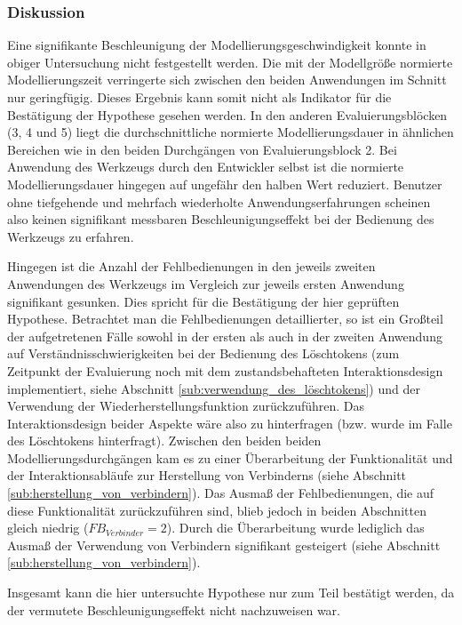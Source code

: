 \subsubsection{Diskussion} 

Eine signifikante Beschleunigung der Modellierungsgeschwindigkeit konnte in obiger Untersuchung nicht festgestellt werden. Die mit der Modellgröße normierte Modellierungszeit verringerte sich zwischen den beiden Anwendungen im Schnitt nur geringfügig. Dieses Ergebnis kann somit nicht als Indikator für die Bestätigung der Hypothese gesehen werden. In den anderen Evaluierungsblöcken (3, 4 und 5) liegt die durchschnittliche normierte Modellierungsdauer in ähnlichen Bereichen wie in den beiden Durchgängen von Evaluierungsblock 2. Bei Anwendung des Werkzeugs durch den Entwickler selbst ist die normierte Modellierungsdauer hingegen auf ungefähr den halben Wert reduziert. Benutzer ohne tiefgehende und mehrfach wiederholte Anwendungserfahrungen scheinen also keinen signifikant messbaren Beschleunigungseffekt bei der Bedienung des Werkzeugs zu erfahren.

Hingegen ist die Anzahl der Fehlbedienungen in den jeweils zweiten Anwendungen des Werkzeugs im Vergleich zur jeweils ersten Anwendung signifikant gesunken. Dies spricht für die Bestätigung der hier geprüften Hypothese. Betrachtet man die Fehlbedienungen detaillierter, so ist ein Großteil der aufgetretenen Fälle sowohl in der ersten als auch in der zweiten Anwendung auf Verständnisschwierigkeiten bei der Bedienung des Löschtokens (zum Zeitpunkt der Evaluierung noch mit dem zustandsbehafteten Interaktionsdesign implementiert, siehe Abschnitt \ref{sub:verwendung_des_löschtokens}) und der Verwendung der Wiederherstellungsfunktion zurückzuführen. Das Interaktionsdesign beider Aspekte wäre also zu hinterfragen (bzw. wurde im Falle des Löschtokens hinterfragt). Zwischen den beiden beiden Modellierungsdurchgängen kam es zu einer Überarbeitung der Funktionalität und der Interaktionsabläufe zur Herstellung von Verbinderns (siehe Abschnitt \ref{sub:herstellung_von_verbindern}). Das Ausmaß der Fehlbedienungen, die auf diese Funktionalität zurückzuführen sind, blieb jedoch in beiden Abschnitten gleich niedrig ($FB_{Verbinder}=2$). Durch die Überarbeitung wurde lediglich das Ausmaß der Verwendung von Verbindern signifikant gesteigert (siehe Abschnitt \ref{sub:herstellung_von_verbindern}).

Insgesamt kann die hier untersuchte Hypothese nur zum Teil bestätigt werden, da der vermutete Beschleunigungseffekt nicht nachzuweisen war.

